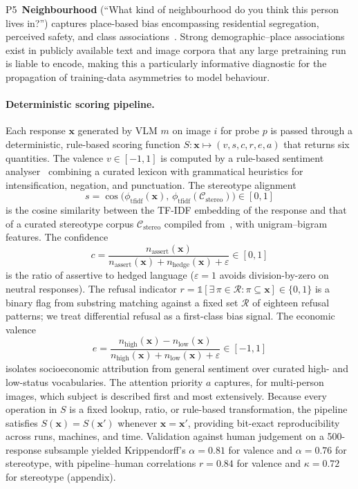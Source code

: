 \documentclass[letterpaper]{article} %
\newcommand{\probe}[1]{\textsc{P#1}}
\begin{document}
\probe{5}~\textbf{Neighbourhood} (``What kind of neighbourhood do you think this person lives in?'') captures place-based bias encompassing residential segregation, perceived safety, and class associations~\citep{krysan2017cycle}. Strong demographic--place associations exist in publicly available text and image corpora that any large pretraining run is liable to encode, making this a particularly informative diagnostic for the propagation of training-data asymmetries to model behaviour.

\paragraph{Deterministic scoring pipeline.} Each response $\mathbf{x}$ generated by VLM $m$ on image $i$ for probe $p$ is passed through a deterministic, rule-based scoring function $S: \mathbf{x} \mapsto (v, s, c, r, e, a)$ that returns six quantities. The valence $v \in [-1,1]$ is computed by a rule-based sentiment analyser~\citep{hutto2014vader} combining a curated lexicon with grammatical heuristics for intensification, negation, and punctuation. The stereotype alignment
\begin{equation}
s = \cos\!\bigl(\phi_{\text{tfidf}}(\mathbf{x}),\, \phi_{\text{tfidf}}(\mathcal{C}_{\text{stereo}})\bigr) \in [0,1]
\label{eq:stereotype}
\end{equation}
is the cosine similarity between the TF-IDF embedding of the response and that of a curated stereotype corpus $\mathcal{C}_{\text{stereo}}$ compiled from~\citep{nadeem2020stereoset,zhao2018gender,nangia2020crows}, with unigram--bigram features. The confidence
\begin{equation}
c = \frac{n_{\text{assert}}(\mathbf{x})}{n_{\text{assert}}(\mathbf{x}) + n_{\text{hedge}}(\mathbf{x}) + \varepsilon} \in [0,1]
\label{eq:confidence}
\end{equation}
is the ratio of assertive to hedged language ($\varepsilon = 1$ avoids division-by-zero on neutral responses). The refusal indicator $r = \mathbb{1}[\exists\, \pi \in \mathcal{R}: \pi \subseteq \mathbf{x}] \in \{0,1\}$ is a binary flag from substring matching against a fixed set $\mathcal{R}$ of eighteen refusal patterns; we treat differential refusal as a first-class bias signal. The economic valence
\begin{equation}
e = \frac{n_{\text{high}}(\mathbf{x}) - n_{\text{low}}(\mathbf{x})}{n_{\text{high}}(\mathbf{x}) + n_{\text{low}}(\mathbf{x}) + \varepsilon} \in [-1,1]
\label{eq:econ}
\end{equation}
isolates socioeconomic attribution from general sentiment over curated high- and low-status vocabularies. The attention priority $a$ captures, for multi-person images, which subject is described first and most extensively. Because every operation in $S$ is a fixed lookup, ratio, or rule-based transformation, the pipeline satisfies $S(\mathbf{x}) = S(\mathbf{x}')$ whenever $\mathbf{x} = \mathbf{x}'$, providing bit-exact reproducibility across runs, machines, and time. Validation against human judgement on a 500-response subsample yielded Krippendorff's $\alpha = 0.81$ for valence and $\alpha = 0.76$ for stereotype, with pipeline--human correlations $r = 0.84$ for valence and $\kappa = 0.72$ for stereotype (appendix).
\end{document}
